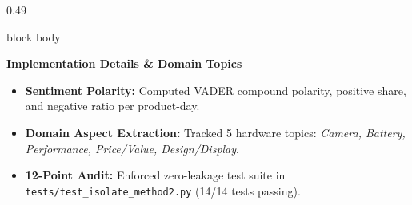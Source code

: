 \documentclass[aspectratio=169, 10pt]{beamer}
\newenvironment{card}[1][]{%
        \begin{beamercolorbox}[rounded=true,shadow=false,wd=\linewidth,sep=3.5pt,#1]{block body}%
        \fontsize{7.8pt}{9.8pt}\selectfont%
    }{%
        \end{beamercolorbox}%
    }
\begin{document}
\begin{frame}[t]
\begin{columns}[T]
            \begin{column}{0.49\textwidth}                                                                                                                                                             
                \begin{card}                                                                                                                                                                           
                    {\fontsize{8pt}{9.5pt}\selectfont \textbf{\color{BlueAccent}Implementation Details \& Domain Topics}}\\[0.06cm]                                                                    
                    \begin{itemize}\setlength{\itemsep}{2pt}                                                                                                                                           
                        \item \textbf{Sentiment Polarity:} Computed VADER compound polarity, positive share, and negative ratio per product-day.                                                       
                        \item \textbf{Domain Aspect Extraction:} Tracked 5 hardware topics: \textit{Camera, Battery, Performance, Price/Value, Design/Display}.                                        
                        \item \textbf{12-Point Audit:} Enforced zero-leakage test suite in \texttt{tests/test\_isolate\_method2.py} (14/14 tests passing).                                             
                    \end{itemize}                                                                                                                                                                      
                \end{card}                                                                                                                                                                             
            \end{column}                                                                                                                                                                               
        \end{columns}                                                                                                                                                                                  

\end{frame}
\end{document}
